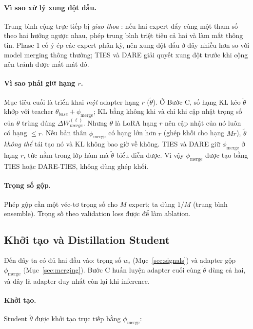 \documentclass[12pt,a4paper]{article}
\newcommand{\pmerge}{\phi_{\mathrm{merge}}}
\begin{document}
\paragraph{Vì sao xử lý xung đột dấu.}
Trung bình cộng trực tiếp bị \emph{giao thoa} \cite{yadav2023ties}: nếu hai expert đẩy cùng một tham số theo hai hướng ngược nhau, phép trung bình triệt tiêu cả hai và làm mất thông tin. Phase 1 cố ý ép các expert phân kỳ, nên xung đột dấu ở đây nhiều hơn so với model merging thông thường; TIES và DARE giải quyết xung đột trước khi cộng nên tránh được mất mát đó.

\paragraph{Vì sao phải giữ hạng $r$.}
Mục tiêu cuối là triển khai \emph{một} adapter hạng $r$ ($\tilde\theta$). Ở Bước C, số hạng KL kéo $\tilde\theta$ khớp với teacher $\theta_{base}+\pmerge$; KL bằng không khi và chỉ khi cập nhật trọng số của $\tilde\theta$ trùng đúng $\Delta W_{merge}^{(\ell)}$. Nhưng $\tilde\theta$ là LoRA hạng $r$ nên cập nhật của nó luôn có hạng $\le r$. Nếu bản thân $\pmerge$ có hạng lớn hơn $r$ (ghép khối cho hạng $Mr$), $\tilde\theta$ \emph{không thể} tái tạo nó và KL không bao giờ về không. TIES và DARE giữ $\pmerge$ ở hạng $r$, tức nằm trong lớp hàm mà $\tilde\theta$ biểu diễn được. Vì vậy $\pmerge$ được tạo bằng TIES hoặc DARE-TIES, không dùng ghép khối.

\paragraph{Trọng số gộp.}
Phép gộp cần một véc-tơ trọng số cho $M$ expert; ta dùng $1/M$ (trung bình ensemble). Trọng số theo validation loss được để làm ablation.

\subsection{Khởi tạo và Distillation Student}
\label{sec:distill}

Đến đây ta có đủ hai đầu vào: trọng số $w_i$ (Mục~\ref{sec:signals}) và adapter gộp $\pmerge$ (Mục~\ref{sec:merging}). Bước C huấn luyện adapter cuối cùng $\tilde\theta$ dùng cả hai, và đây là adapter duy nhất còn lại khi inference.

\paragraph{Khởi tạo.}
Student $\tilde\theta$ được khởi tạo trực tiếp bằng $\pmerge$:
\end{document}
